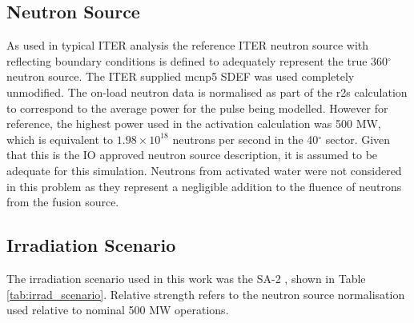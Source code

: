 \documentclass[12pt]{article}
\begin{document}
\subsection{Neutron Source}
As used in typical ITER analysis the reference ITER neutron source 
\cite{iter_n_src} with
reflecting boundary conditions is defined to adequately represent the
true 360$^{\circ}$ neutron source. The ITER supplied \gls{mcnp5} SDEF was used
completely unmodified. The on-load neutron data is normalised as part of the 
\gls{r2s} calculation to correspond to the 
average power for the pulse being modelled. However for reference,
the highest power used in the activation calculation was 500 MW, which is
equivalent to $1.98 \times 10^{18}$ neutrons per second in the 40$^{\circ}$
sector. Given that this is the IO approved neutron source description, it is
assumed to be adequate for this simulation.  Neutrons from activated water
were not considered in this problem as they represent a negligible addition
to the fluence of neutrons from the fusion source.

\subsection{Irradiation Scenario}
The irradiation scenario used in this work was the SA-2 \cite{sa2_irradiation}, 
shown in Table \ref{tab:irrad_scenario}. Relative strength refers to the 
neutron source normalisation used relative to nominal 500 MW operations.
\end{document}
